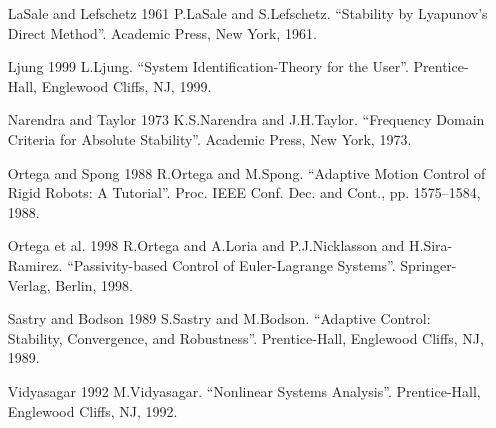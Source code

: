 \documentclass[UTF8,12pt,a4paper]{ctexart}
\theoremstyle{definition}
\begin{document}
\begin{enumerate}
\item [LaSale and Lefschetz 1961] P.LaSale and S.Lefschetz. ``Stability by Lyapunov's Direct Method''. Academic Press, New York, 1961.

\item [Ljung 1999] L.Ljung. ``System Identification-Theory for the User''. Prentice-Hall, Englewood Cliffs, NJ, 1999.

\item [Narendra and Taylor 1973] K.S.Narendra and J.H.Taylor. ``Frequency Domain Criteria for Absolute Stability''. Academic Press, New York, 1973.

\item [Ortega and Spong 1988] R.Ortega and M.Spong. ``Adaptive Motion Control of Rigid Robots: A Tutorial''. Proc. IEEE Conf. Dec. and Cont., pp. 1575--1584, 1988.

\item [Ortega et al. 1998] R.Ortega and A.Loria and P.J.Nicklasson and H.Sira-Ramirez. ``Passivity-based Control of Euler-Lagrange Systems''. Springer-Verlag, Berlin, 1998.

\item [Sastry and Bodson 1989] S.Sastry and M.Bodson. ``Adaptive Control: Stability, Convergence, and Robustness''. Prentice-Hall, Englewood Cliffs, NJ, 1989.

\item [Vidyasagar 1992] M.Vidyasagar. ``Nonlinear Systems Analysis''. Prentice-Hall, Englewood Cliffs, NJ, 1992.
\end{enumerate}
\end{document}
